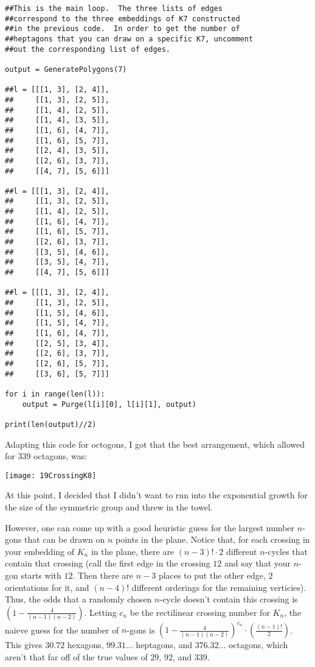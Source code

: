 \documentclass[11pt]{article}
\theoremstyle{definition}
\begin{document}
\begin{verbatim}
##This is the main loop.  The three lists of edges
##correspond to the three embeddings of K7 constructed
##in the previous code.  In order to get the number of
##heptagons that you can draw on a specific K7, uncomment
##out the corresponding list of edges.

output = GeneratePolygons(7)

##l = [[[1, 3], [2, 4]],
##     [[1, 3], [2, 5]],
##     [[1, 4], [2, 5]],
##     [[1, 4], [3, 5]],
##     [[1, 6], [4, 7]],
##     [[1, 6], [5, 7]],
##     [[2, 4], [3, 5]],
##     [[2, 6], [3, 7]],
##     [[4, 7], [5, 6]]]

##l = [[[1, 3], [2, 4]],
##     [[1, 3], [2, 5]],
##     [[1, 4], [2, 5]],
##     [[1, 6], [4, 7]],
##     [[1, 6], [5, 7]],
##     [[2, 6], [3, 7]],
##     [[3, 5], [4, 6]],
##     [[3, 5], [4, 7]],
##     [[4, 7], [5, 6]]]

##l = [[[1, 3], [2, 4]],
##     [[1, 3], [2, 5]],
##     [[1, 5], [4, 6]],
##     [[1, 5], [4, 7]],
##     [[1, 6], [4, 7]],
##     [[2, 5], [3, 4]],
##     [[2, 6], [3, 7]],
##     [[2, 6], [5, 7]],
##     [[3, 6], [5, 7]]]

for i in range(len(l)):
    output = Purge(l[i][0], l[i][1], output)

print(len(output)//2)
\end{verbatim}
Adapting this code for octogons, I got that the best arrangement, which allowed for $339$ octagons, was:

\texttt{[image: 19CrossingK8]}

At this point, I decided that I didn't want to run into the exponential growth for the size of the symmetric group and threw in the towel.  

However, one can come up with a good heuristic guess for the largest number $n$-gons that can be drawn on $n$ points in the plane.  Notice that, for each crossing in your embedding of $K_n$ in the plane, there are $(n-3)!\cdot 2$ different $n$-cycles that contain that crossing (call the first edge in the crossing $12$ and say that your $n$-gon starts with $12$.  Then there are $n-3$ places to put the other edge, $2$ orientations for it, and $(n-4)!$ different orderings for the remaining verticies).  Thus, the odds that a randomly chosen $n$-cycle doesn't contain this crossing is $\left(1-\frac{4}{(n-1)(n-2)}\right)$.  Letting $c_n$ be the rectilinear crossing number for $K_n$, the naieve guess for the number of $n$-gons is $\left(1-\frac{4}{(n-1)(n-2)}\right)^{c_n}\cdot\left(\frac{(n-1)!}{2}\right)$.  This gives $30.72$ hexagons, $99.31\ldots$ heptagons, and $376.32\ldots$ octagons, which aren't that far off of the true values of $29$, $92$, and $339$.  
\end{document}
